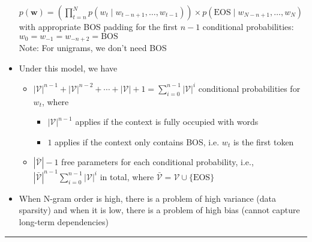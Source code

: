 \begin{itemize}
    $
    p(\boldsymbol{w}) = \left(\prod_{t=n}^N p(w_t \mid w_{t-n+1}, \ldots, w_{t-1})\right) \times p(\textrm{EOS} \mid w_{N-n+1}, \ldots, w_N) 
    $ with appropriate BOS padding for the first $n-1$ conditional probabilities: $w_0 = w_{-1} = w_{-n+2} = \textrm{BOS}$\\
    Note: For unigrams, we don't need BOS
    \item Under this model, we have 
    \begin{itemize}
        \item $
        |\mathcal{V}|^{n-1} + |\mathcal{V}|^{n-2} + \cdots + |\mathcal{V}| + 1 = \sum_{i=0}^{n-1} |\mathcal{V}|^i
        $
        conditional probabilities for $w_t$, where 
        \begin{itemize}
            \item $|\mathcal{V}|^{n-1}$ applies if the context is fully occupied with words
            \item $1$ applies if the context only contains BOS, i.e. $w_t$ is the first token
        \end{itemize}
        \item $|\bar{\mathcal{V}}|-1$ free parameters for each conditional probability, i.e., $|\bar{\mathcal{V}}|^{n-1} \sum_{i=0}^{n-1} |\mathcal{V}|^i$ in total, where $\bar{\mathcal{V}} = \mathcal{V} \cup \{\textrm{EOS}\}$
    \end{itemize}
    \item When N-gram order is high, there is a problem of high variance (data sparsity) and when it is low, there is a problem of high bias (cannot capture long-term dependencies)
\end{itemize}

{\color{black}\hrule height 0.001mm}

